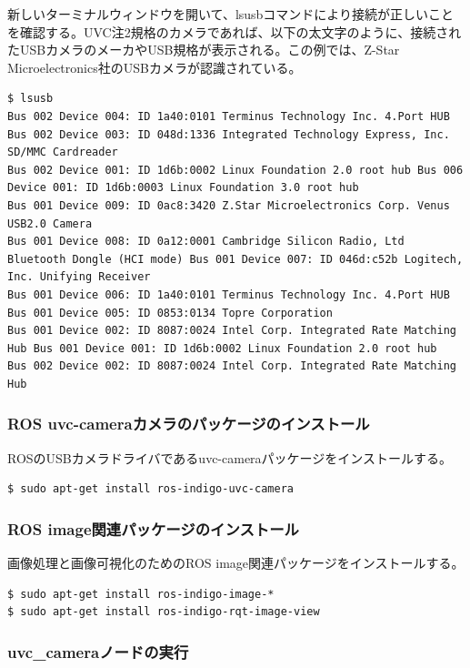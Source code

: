 新しいターミナルウィンドウを開いて、lsusbコマンドにより接続が正しいことを確認する。UVC注2規格のカメラであれば、以下の太文字のように、接続されたUSBカメラのメーカやUSB規格が表示される。この例では、Z-Star Microelectronics社のUSBカメラが認識されている。

\begin{lstlisting}[language=ROS]
$ lsusb
Bus 002 Device 004: ID 1a40:0101 Terminus Technology Inc. 4.Port HUB
Bus 002 Device 003: ID 048d:1336 Integrated Technology Express, Inc. SD/MMC Cardreader
Bus 002 Device 001: ID 1d6b:0002 Linux Foundation 2.0 root hub Bus 006 Device 001: ID 1d6b:0003 Linux Foundation 3.0 root hub
Bus 001 Device 009: ID 0ac8:3420 Z.Star Microelectronics Corp. Venus USB2.0 Camera
Bus 001 Device 008: ID 0a12:0001 Cambridge Silicon Radio, Ltd Bluetooth Dongle (HCI mode) Bus 001 Device 007: ID 046d:c52b Logitech, Inc. Unifying Receiver
Bus 001 Device 006: ID 1a40:0101 Terminus Technology Inc. 4.Port HUB Bus 001 Device 005: ID 0853:0134 Topre Corporation
Bus 001 Device 002: ID 8087:0024 Intel Corp. Integrated Rate Matching Hub Bus 001 Device 001: ID 1d6b:0002 Linux Foundation 2.0 root hub
Bus 002 Device 002: ID 8087:0024 Intel Corp. Integrated Rate Matching Hub
\end{lstlisting}

\subsubsection{ROS uvc-cameraカメラのパッケージのインストール}

ROSのUSBカメラドライバであるuvc-cameraパッケージをインストールする。

\begin{lstlisting}[language=ROS]
$ sudo apt-get install ros-indigo-uvc-camera
\end{lstlisting}

\subsubsection{ROS image関連パッケージのインストール}

画像処理と画像可視化のためのROS image関連パッケージをインストールする。

\begin{lstlisting}[language=ROS]
$ sudo apt-get install ros-indigo-image-*
$ sudo apt-get install ros-indigo-rqt-image-view
\end{lstlisting}

\subsubsection{uvc\_cameraノードの実行}

